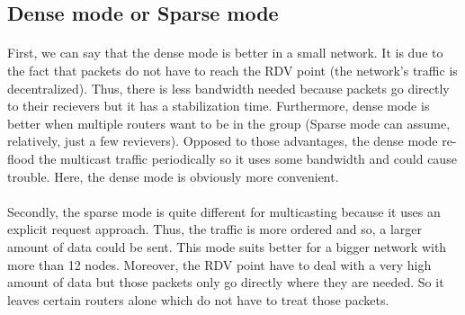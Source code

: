 \documentclass[a4paper]{article}
\begin{document}
  \subsection{Dense mode or Sparse mode}
	 \paragraph{} First, we can say that the dense mode is better in a small network. It is due to the fact that packets do not have to reach the RDV point (the network's traffic is decentralized). Thus, there is less bandwidth needed because packets go directly to their recievers but it has a stabilization time. Furthermore, dense mode is better when multiple routers want to be in the group (Sparse mode can assume, relatively, just a few revievers). Opposed to those advantages, the dense mode re-flood  the multicast traffic periodically so it uses some bandwidth and could cause trouble. Here, the dense mode is obviously more convenient.

	\paragraph{} Secondly, the sparse mode is quite different for multicasting because it uses an explicit request approach. Thus, the traffic is more ordered and so, a larger amount of data could be sent. This mode suits better for a bigger network with more than 12 nodes. Moreover, the RDV point have to deal with a very high amount of data but those packets only go directly where they are needed. So it leaves certain routers alone which do not have to treat those packets.
\end{document}
